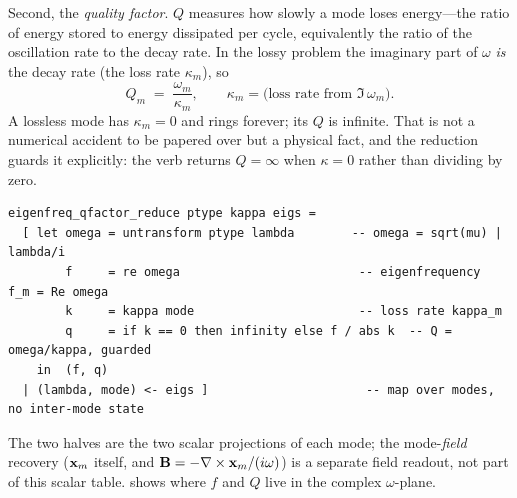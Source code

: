 Second, the \emph{quality factor}. $Q$ measures how slowly a mode loses
energy---the ratio of energy stored to energy dissipated per cycle, equivalently
the ratio of the oscillation rate to the decay rate. In the lossy problem the
imaginary part of $\omega$ \emph{is} the decay rate (the loss rate $\kappa_m$),
so
\begin{equation}
  Q_m \;=\; \frac{\omega_m}{\kappa_m},
  \qquad
  \kappa_m = \text{(loss rate from }\Im\,\omega_m\text{)} .
  \label{eq:qfactor}
\end{equation}
A lossless mode has $\kappa_m=0$ and rings forever; its $Q$ is infinite. That is
not a numerical accident to be papered over but a physical fact, and the
reduction guards it explicitly: the verb 
returns $Q=\infty$ when $\kappa=0$ rather than dividing by zero.
\begin{lstlisting}[style=l4style]
eigenfreq_qfactor_reduce ptype kappa eigs =
  [ let omega = untransform ptype lambda        -- omega = sqrt(mu) | lambda/i
        f     = re omega                         -- eigenfrequency  f_m = Re omega
        k     = kappa mode                       -- loss rate kappa_m
        q     = if k == 0 then infinity else f / abs k  -- Q = omega/kappa, guarded
    in  (f, q)
  | (lambda, mode) <- eigs ]                      -- map over modes, no inter-mode state
\end{lstlisting}
The two halves are the two scalar projections of each mode; the mode-\emph{field}
recovery ($\mathbf{x}_m$ itself, and $\mathbf{B}=-\nabla\times\mathbf{x}_m/(i\omega)$) is a separate field
readout, not part of this scalar table.  shows where $f$
and $Q$ live in the complex $\omega$-plane.

